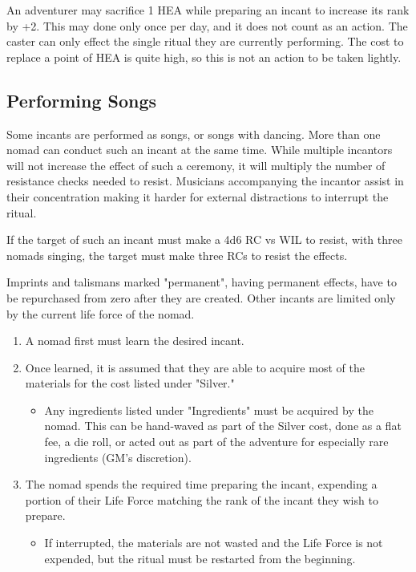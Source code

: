 An adventurer may sacrifice 1 HEA while preparing an incant to increase its rank by +2. This may done only once per day, and it does not count as an action. The caster can only effect the single ritual they are currently performing. The cost to replace a point of HEA is quite high, so this is not an action to be taken lightly.

\subsection{Performing Songs}

Some incants are performed as songs, or songs with dancing. More than one nomad can conduct such an incant at the same time. While multiple incantors will not increase the effect of such a ceremony, it will multiply the number of resistance checks needed to resist. Musicians accompanying the incantor assist in their concentration making it harder for external distractions to interrupt the ritual.

If the target of such an incant must make a 4d6 RC vs WIL to resist, with three nomads singing, the target must make three RCs to resist the effects. 

Imprints and talismans marked "permanent", having permanent effects, have to be repurchased from zero after they are created. Other incants are limited only by the current life force of the nomad.\\

\begin{normboxlist}
\begin{enumerate}
\item A nomad first must learn the desired incant.
\item Once learned, it is assumed that they are able to acquire most of the materials for the cost listed under "Silver."
\begin{itemize}
\item[] Any ingredients listed under "Ingredients" must be acquired by the nomad. This can be hand-waved as part of the Silver cost, done as a flat fee, a die roll, or acted out as part of the adventure for especially rare ingredients (GM's discretion). 
\end{itemize}
\item The nomad spends the required time preparing the incant, expending a portion of their Life Force matching the rank of the incant they wish to prepare.
\begin{itemize}
\item[] If interrupted, the materials are not wasted and the Life Force is not expended, but the ritual must be restarted from the beginning.
\end{itemize}
\end{enumerate}
\end{normboxlist}

